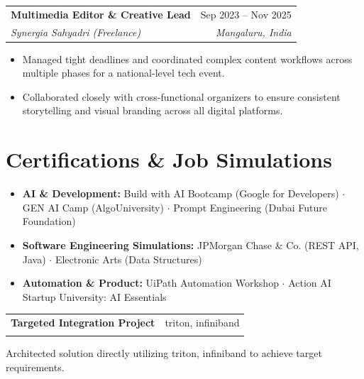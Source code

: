 \documentclass[letterpaper,10pt]{article}
\makeatletter
\newcommand{\resumeSubheading}[4]{
  \vspace{2pt}\noindent
    \begin{tabular*}{0.97\textwidth}[t]{l@{\extracolsep{\fill}}r}
      \textbf{#1} & #2 \\
      \textit{\small#3} & \textit{\small #4} \\
    \end{tabular*}\vspace{-5pt}
}
\newcommand{\resumeItemListStart}{\begin{itemize}[leftmargin=0.15in, label={--}]}
\newcommand{\resumeItemListEnd}{\end{itemize}\vspace{-5pt}}
\newcommand{\resumeItem}[1]{\item\small{#1 \vspace{-2pt}}}
\makeatother
\begin{document}
\resumeSubheading
  {Multimedia Editor \& Creative Lead}{Sep 2023 -- Nov 2025}
  {Synergia Sahyadri (Freelance)}{Mangaluru, India}
\resumeItemListStart
  \resumeItem{Managed tight deadlines and coordinated complex content workflows across multiple phases for a national-level tech event.}
  \resumeItem{Collaborated closely with cross-functional organizers to ensure consistent storytelling and visual branding across all digital platforms.}
\resumeItemListEnd

\section*{Certifications \& Job Simulations}
\begin{itemize}[leftmargin=0.15in, label={}]
  \resumeItem{\textbf{AI \& Development:} Build with AI Bootcamp (Google for Developers) $\cdot$ GEN AI Camp (AlgoUniversity) $\cdot$ Prompt Engineering (Dubai Future Foundation)}
  \resumeItem{\textbf{Software Engineering Simulations:} JPMorgan Chase \& Co. (REST API, Java) $\cdot$ Electronic Arts (Data Structures)}
  \resumeItem{\textbf{Automation \& Product:} UiPath Automation Workshop $\cdot$ Action AI Startup University: AI Essentials}
\end{itemize}


\resumeSubheading{Targeted Integration Project}{triton, infiniband}{}{}
  \resumeItem{Architected solution directly utilizing triton, infiniband to achieve target requirements.}
\end{document}
